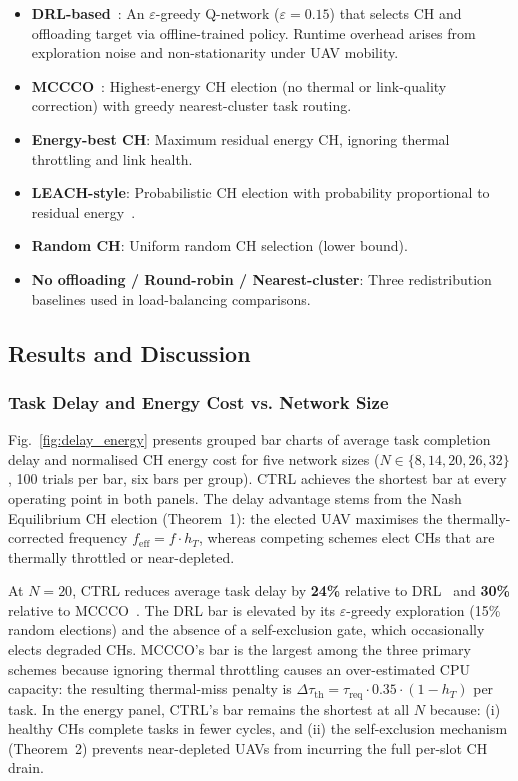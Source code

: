\documentclass[journal]{IEEEtran}
\begin{document}
\begin{IEEEproof}
\begin{itemize}
  \item \textbf{DRL-based}~\cite{ref1}: An $\varepsilon$-greedy
        Q-network ($\varepsilon=0.15$) that selects CH and offloading
        target via offline-trained policy.  Runtime overhead arises from
        exploration noise and non-stationarity under UAV mobility.
  \item \textbf{MCCCO}~\cite{ref2}: Highest-energy CH election
        (no thermal or link-quality correction) with greedy
        nearest-cluster task routing.
  \item \textbf{Energy-best CH}: Maximum residual energy CH,
        ignoring thermal throttling and link health.
  \item \textbf{LEACH-style}: Probabilistic CH election with
        probability proportional to residual energy~\cite{ref4}.
  \item \textbf{Random CH}: Uniform random CH selection (lower bound).
  \item \textbf{No offloading / Round-robin / Nearest-cluster}: Three
        redistribution baselines used in load-balancing comparisons.
\end{itemize}

\subsection{Results and Discussion}
\label{sec:res}

\subsubsection{Task Delay and Energy Cost vs. Network Size}

Fig.~\ref{fig:delay_energy} presents grouped bar charts of average task
completion delay and normalised CH energy cost for five network sizes
($N \in \{8, 14, 20, 26, 32\}$, 100 trials per bar, six bars per group).
CTRL achieves the shortest bar at every operating point in both panels.
The delay advantage stems from the Nash Equilibrium CH election
(Theorem~1): the elected UAV maximises the thermally-corrected
frequency $f_{\mathrm{eff}} = f \cdot h_T$, whereas competing schemes
elect CHs that are thermally throttled or near-depleted.

At $N = 20$, CTRL reduces average task delay by \textbf{24\%} relative to
DRL~\cite{ref1} and \textbf{30\%} relative to MCCCO~\cite{ref2}.
The DRL bar is elevated by its $\varepsilon$-greedy exploration
(15\% random elections) and the absence of a self-exclusion gate, which
occasionally elects degraded CHs.  MCCCO's bar is the largest among the
three primary schemes because ignoring thermal throttling causes an
over-estimated CPU capacity: the resulting thermal-miss penalty is
$\Delta\tau_{\text{th}} = \tau_{\text{req}} \cdot 0.35 \cdot (1 - h_T)$
per task.  In the energy panel, CTRL's bar remains the shortest at all
$N$ because: (i) healthy CHs complete tasks in fewer cycles, and (ii)
the self-exclusion mechanism (Theorem~2) prevents near-depleted UAVs
from incurring the full per-slot CH drain.


\end{IEEEproof}
\end{document}
